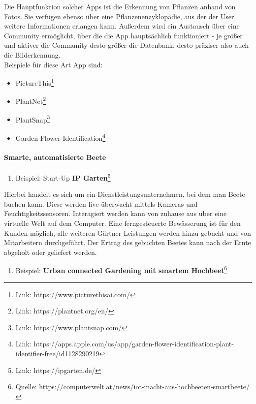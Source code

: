 Die Hauptfunktion solcher Apps ist die Erkennung von Pflanzen anhand von
Fotos. Sie verfügen ebenso über eine Pflanzenenzyklopädie, aus der der
User weitere Informationen erlangen kann. Außerdem wird ein Austausch
über eine Community ermöglicht, über die die App hauptsächlich
funktioniert - je größer und aktiver die Community desto größer die
Datenbank, desto präziser also auch die Bilderkennung.\\
Beispiele für diese Art App sind:

\begin{itemize}
\tightlist
\item
  PictureThis\footnote{Link: https://www.picturethisai.com/}
\item
  PlantNet\footnote{Link: https://plantnet.org/en/}
\item
  PlantSnap\footnote{Link: https://www.plantsnap.com/}
\item
  Garden Flower Identification\footnote{Link:
    https://apps.apple.com/us/app/garden-flower-identification-plant-identifier-free/id1128290219}
\end{itemize}

\hypertarget{smarte-automatisierte-beete}{%
\paragraph{Smarte, automatisierte
Beete}\label{smarte-automatisierte-beete}}

\begin{enumerate}
\def\labelenumi{\arabic{enumi}.}
\tightlist
\item
  Beispiel: Start-Up \textbf{IP Garten}\footnote{Link:
    https://ipgarten.de/}
\end{enumerate}

Hierbei handelt es sich um ein Dienstleistungsunternehmen, bei dem man
Beete buchen kann. Diese werden live überwacht mittels Kameras und
Feuchtigkeitssensoren. Interagiert werden kann von zuhause aus über eine
virtuelle Welt auf dem Computer. Eine ferngesteuerte Bewässerung ist für
den Kunden möglich, alle weiteren Gärtner-Leistungen werden hinzu
gebucht und von Mitarbeitern durchgeführt. Der Ertrag des gebuchten
Beetes kann nach der Ernte abgeholt oder geliefert werden.

\begin{enumerate}
\def\labelenumi{\arabic{enumi}.}
\setcounter{enumi}{1}
\tightlist
\item
  Beispiel: \textbf{Urban connected Gardening mit smartem
  Hochbeet}\footnote{Quelle:
    https://computerwelt.at/news/iot-macht-aus-hochbeeten-smartbeete/}
\end{enumerate}


